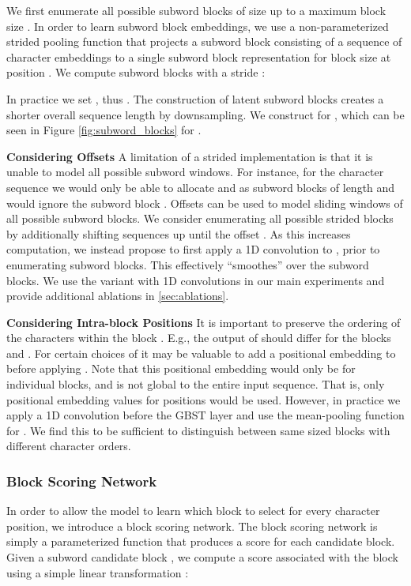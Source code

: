 \documentclass{article} \usepackage{iclr2022_conference,times}
\begin{document}
We first enumerate all possible subword blocks of size  up to a maximum block size . In order to learn subword block embeddings, we use a non-parameterized strided pooling function  that projects a subword block consisting of a sequence of character embeddings  to a single subword block representation  for block size  at position . We compute subword blocks  with a stride :

In practice we set , thus . The construction of latent subword blocks creates a shorter overall sequence length by downsampling. We construct  for , which can be seen in Figure \ref{fig:subword_blocks} for .

\noindent \textbf{Considering Offsets}  A limitation of a strided implementation is that it is unable to model all possible subword windows. For instance, for the character sequence  we would only be able to allocate  and  as subword blocks of length  and would ignore the subword block . Offsets can be used to model sliding windows of all possible subword blocks. We consider enumerating all possible strided blocks by additionally shifting sequences up until the offset . As this increases computation, we instead propose to first apply a 1D convolution to , prior to enumerating subword blocks. This effectively ``smoothes'' over the subword blocks. We use the variant with 1D convolutions in our main experiments and provide additional ablations in \textsection \ref{sec:ablations}.


\noindent \textbf{Considering Intra-block Positions}  It is important to preserve the ordering of the characters within the block . E.g., the output of  should differ for the blocks  and . For certain choices of  it may be valuable to add a positional embedding \citep{NIPS2017_3f5ee243} to  before applying . Note that this positional embedding would only be for individual blocks, and is not global to the entire input sequence. That is, only positional embedding values for positions  would be used. However, in practice we apply a 1D convolution before the GBST layer and use the mean-pooling function for . We find this to be sufficient to distinguish between same sized blocks with different character orders.

\subsubsection{Block Scoring Network}
In order to allow the model to learn which block to select for every character position, we introduce a block scoring network. The block scoring network is simply a parameterized function  that produces a score for each candidate block. Given a subword candidate block , we compute a score  associated with the block using a simple linear transformation :
\end{document}
